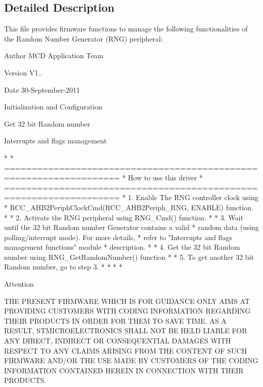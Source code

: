 \subsection{Detailed Description}
This file provides firmware functions to manage the following functionalities of the Random Number Generator (R\+NG) peripheral\+: 

\begin{DoxyAuthor}{Author}
M\+CD Application Team 
\end{DoxyAuthor}
\begin{DoxyVersion}{Version}
V1.. 
\end{DoxyVersion}
\begin{DoxyDate}{Date}
30-\/\+September-\/2011
\begin{DoxyItemize}
\item Initialization and Configuration
\item Get 32 bit Random number
\item Interrupts and flags management
\end{DoxyItemize}
\end{DoxyDate}
\begin{DoxyVerb}*                               
*          ===================================================================      
*                                   How to use this driver
*          ===================================================================          
*          1. Enable The RNG controller clock using 
*            RCC_AHB2PeriphClockCmd(RCC_AHB2Periph_RNG, ENABLE) function.
*              
*          2. Activate the RNG peripheral using RNG_Cmd() function.
*          
*          3. Wait until the 32 bit Random number Generator contains a valid 
*            random data (using polling/interrupt mode). For more details, 
*            refer to "Interrupts and flags management functions" module 
*            description.
*           
*          4. Get the 32 bit Random number using RNG_GetRandomNumber() function
*          
*          5. To get another 32 bit Random number, go to step 3.       
*
*         
*              
*  \end{DoxyVerb}


\begin{DoxyAttention}{Attention}

\end{DoxyAttention}
T\+HE P\+R\+E\+S\+E\+NT F\+I\+R\+M\+W\+A\+RE W\+H\+I\+CH IS F\+OR G\+U\+I\+D\+A\+N\+CE O\+N\+LY A\+I\+MS AT P\+R\+O\+V\+I\+D\+I\+NG C\+U\+S\+T\+O\+M\+E\+RS W\+I\+TH C\+O\+D\+I\+NG I\+N\+F\+O\+R\+M\+A\+T\+I\+ON R\+E\+G\+A\+R\+D\+I\+NG T\+H\+E\+IR P\+R\+O\+D\+U\+C\+TS IN O\+R\+D\+ER F\+OR T\+H\+EM TO S\+A\+VE T\+I\+ME. AS A R\+E\+S\+U\+LT, S\+T\+M\+I\+C\+R\+O\+E\+L\+E\+C\+T\+R\+O\+N\+I\+CS S\+H\+A\+LL N\+OT BE H\+E\+LD L\+I\+A\+B\+LE F\+OR A\+NY D\+I\+R\+E\+CT, I\+N\+D\+I\+R\+E\+CT OR C\+O\+N\+S\+E\+Q\+U\+E\+N\+T\+I\+AL D\+A\+M\+A\+G\+ES W\+I\+TH R\+E\+S\+P\+E\+CT TO A\+NY C\+L\+A\+I\+MS A\+R\+I\+S\+I\+NG F\+R\+OM T\+HE C\+O\+N\+T\+E\+NT OF S\+U\+CH F\+I\+R\+M\+W\+A\+RE A\+N\+D/\+OR T\+HE U\+SE M\+A\+DE BY C\+U\+S\+T\+O\+M\+E\+RS OF T\+HE C\+O\+D\+I\+NG I\+N\+F\+O\+R\+M\+A\+T\+I\+ON C\+O\+N\+T\+A\+I\+N\+ED H\+E\+R\+E\+IN IN C\+O\+N\+N\+E\+C\+T\+I\+ON W\+I\+TH T\+H\+E\+IR P\+R\+O\+D\+U\+C\+TS.

